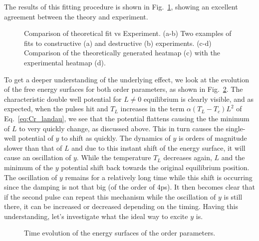 The results of this fitting procedure is shown in Fig.~\ref{fig:Cr_theoretical_fit}, showing an excellent agreement between the theory and experiment.
\begin{figure}
\caption{\label{fig:Cr_theoretical_fit} Comparison of theoretical fit vs Experiment. (a-b) Two examples of fits to constructive (a) and destructive (b) experiments. (c-d) Comparison of the theoretically generated heatmap (c) with the experimental heatmap (d).}
\end{figure}

To get a deeper understanding of the underlying effect, we look at the evolution of the free energy surfaces for both order parameters, as shown in Fig.~\ref{fig:Cr_energy_surfaces}. The characteristic double well potential for $L\neq0$ equilibrium is clearly visible, and as expected, when the pulses hit and $T_L$ increases in the term $\alpha(T_L-T_c)L^2$ of Eq.~\ref{eq:Cr_landau}, we see that the potential flattens causing the the minimum of $L$ to very quickly change, as discussed above. This in turn causes the single-well potential of $y$ to shift as quickly. The dynamics of $y$ is orders of magnitude slower than that of $L$ and due to this instant shift of the energy surface, it will cause an oscillation of $y$. While the temperature $T_L$ decreases again, $L$ and the minimum of the $y$ potential shift back towards the original equilibrium position. The oscillation of $y$ remains for a relatively long time while this shift is occurring since the damping is not that big (of the order of 4ps). It then becomes clear that if the second pulse can repeat this mechanism while the oscillation of $y$ is still there, it can be increased or decreased depending on the timing. Having this understanding, let's investigate what the ideal way to excite $y$ is. 


\begin{figure}
	\begin{subfigure}{0.5\textwidth}
	\end{subfigure}
	\begin{subfigure}{0.5\textwidth}
	\end{subfigure}
	\caption{\label{fig:Cr_energy_surfaces} Time evolution of the energy surfaces of the order parameters.}
\end{figure}

